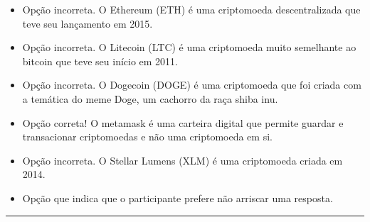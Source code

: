 \begin{itemize}
	\item {}
	
	Opção incorreta. O Ethereum (ETH) é uma criptomoeda descentralizada que teve seu lançamento em 2015.
	
	\item {}
	
	Opção incorreta. O Litecoin (LTC) é uma criptomoeda muito semelhante ao bitcoin que teve seu início em 2011.
	
	\item {} 
	
	 Opção incorreta. O Dogecoin (DOGE) é uma criptomoeda que foi criada com a temática do meme Doge, um cachorro da raça shiba inu. 
	 
	\item {}
	
	 Opção correta! O metamask é uma carteira digital que permite guardar e transacionar criptomoedas e não uma criptomoeda em si.
	 
	\item {} 
	
	Opção incorreta. O Stellar Lumens (XLM) é uma criptomoeda criada em 2014.
	
	\item {} 
	
	Opção que indica que o participante prefere não arriscar uma resposta.
\end{itemize}

\rule{\linewidth}{0.5mm}

